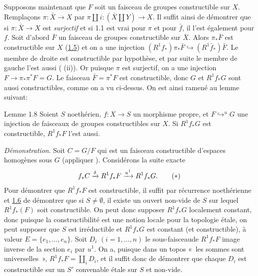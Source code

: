 \documentclass[10pt]{../fichiers-configuration-latex/smfart}
\begin{document}
Supposons maintenant que $F$ soit un faisceau de groupes constructible
sur $X$. Remplaçons $\pi:\bar{X}\rightarrow X$ par $\pi\amalg i:
(\bar{X}\amalg Y)\rightarrow X$.
 Il suffit ainsi de démontrer que si
$\pi:\bar{X}\rightarrow X$ est \emph{surjectif} et si 1.1 est vrai
pour $\pi$ et pour $\bar{f}$, il l'est également pour $f$. Soit
d'abord $\bar{F}$ un faisceau de groupes constructible sur
$\bar{X}$. Alors $\pi_{\ast}\bar{F}$ est constructible sur $X$
(\hyperref[XIV.lem1.5]{1.5}) 
et on a une injection $(R^{1}f_{\ast})\pi_{\ast}\bar{F}\hookrightarrow
(R^{1}\bar{f}_{\ast})\bar{F}$. Le membre de droite est constructible
par hypothèse, et par suite le membre de gauche l'est aussi (
(ii)). Or\sisi{}{,} puisque $\pi$ est surjectif, on a une injection
$F\rightarrow \pi_{\ast}\pi^{\ast}F=G$. Le faisceau
$\bar{F}=\pi^{\ast}F$ est constructible, donc $G$ et $R^{1}f_{\ast}G$
sont aussi constructibles, comme on a vu ci-dessus. On est ainsi
ramené au lemme suivant:

\begin{enonce*}{Lemme 1.8}
Soient $S$ noethérien, $f:X\rightarrow S$ un morphisme propre, et 
$\displaystyle{F\mathop{\hookrightarrow}^{u}G}$
une injection de faisceaux de groupes constructibles sur $X$. Si
$R^{1}f_{\ast}G$ est constructible, $R^{1}f_{\ast}F$ l'est aussi.
\end{enonce*}

\noindent
\emph{Démonstration}. Soit $C=G/F$ qui est un faisceau constructible
d'espaces homogènes sous $G$ (appliquer ). Considérons la suite
exacte
\begin{equation*}
f_{\ast}C\xrightarrow{\delta}R^{1}f_{\ast}F\xrightarrow{u^{1}}R^{1}f_{\ast}G{}.\tag{$\ast$}
\end{equation*}
Pour démontrer que $R^{1}f_{\ast}F$ est constructible, il suffit par
récurrence noethérienne et \hyperref[XIV.lem1.6]{1.6} de démontrer que si 
$S\neq ∅$, il 
existe un ouvert non-vide de $S$ sur lequel $R^{1}f_{\ast}(F)$ soit
constructible. On peut donc supposer $R^{1}f_{\ast}G$ localement
constant, donc puisque la constructibilité est une notion locale pour
la topologie étale, on peut supposer que $S$ est irréductible et
$R^{1}f_{\ast}G$ est constant (et constructible), à valeur
$E=\{e_1,\ldots,e_n\}$. Soit $D_i$ $(i=1,\ldots,n)$ le
sous-faisceau\pageoriginale de $R^{1}f_{\ast}F$ image inverse de la
section $e_{i}$ par $u^{1}$. On a, puisque dans un topos « les
sommes sont universelles », $R^{1}f_{\ast}F=\amalg_i D_i$, et il
suffit donc de démontrer que chaque $D_i$ est constructible sur un
$S'$ convenable étale sur $S$ et non-vide.
\end{document}
